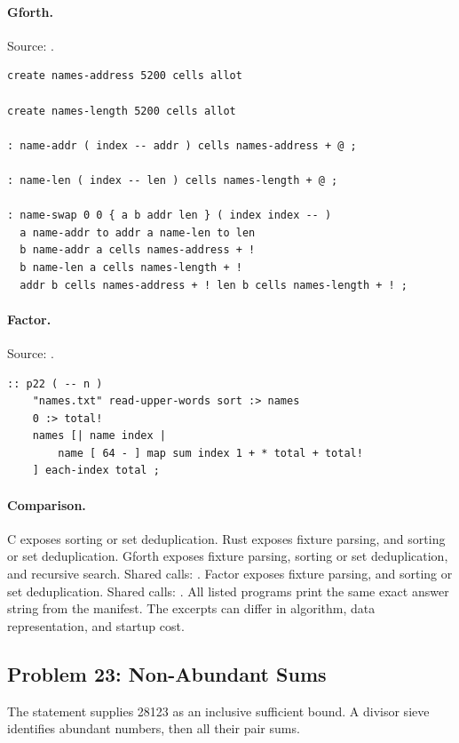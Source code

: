\paragraph{Gforth.} Source: .
\begin{lstlisting}
create names-address 5200 cells allot

create names-length 5200 cells allot

: name-addr ( index -- addr ) cells names-address + @ ;

: name-len ( index -- len ) cells names-length + @ ;

: name-swap 0 0 { a b addr len } ( index index -- )
  a name-addr to addr a name-len to len
  b name-addr a cells names-address + !
  b name-len a cells names-length + !
  addr b cells names-address + ! len b cells names-length + ! ;
\end{lstlisting}

\paragraph{Factor.} Source: .
\begin{lstlisting}
:: p22 ( -- n )
    "names.txt" read-upper-words sort :> names
    0 :> total!
    names [| name index |
        name [ 64 - ] map sum index 1 + * total + total!
    ] each-index total ;
\end{lstlisting}

\paragraph{Comparison.}
C exposes sorting or set deduplication. Rust exposes fixture parsing, and sorting or set deduplication. Gforth exposes fixture parsing, sorting or set deduplication, and recursive search. Shared calls: \texttt{}. Factor exposes fixture parsing, and sorting or set deduplication. Shared calls: \texttt{}.
All listed programs print the same exact answer string from the manifest. The excerpts can differ in algorithm, data representation, and startup cost.

\subsection{Problem 23: Non-Abundant Sums}
\label{walkthrough:p23}
The statement supplies 28123 as an inclusive sufficient bound. A divisor sieve identifies abundant numbers, then all their pair sums.

